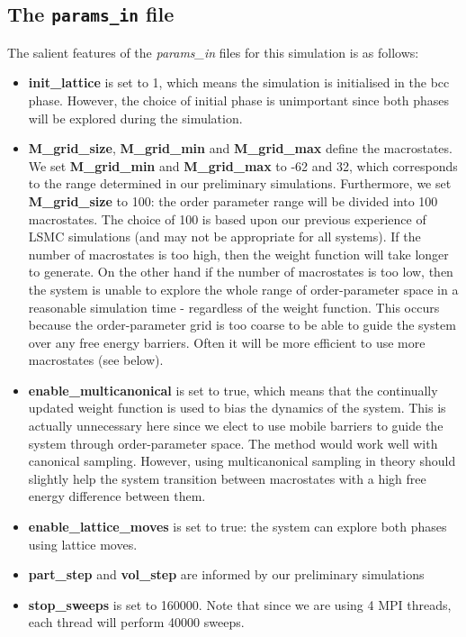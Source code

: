 \documentclass{report}
\begin{document}
\subsection{The \texttt{params\_in} file}
The salient features of the \emph{params\_in} files for this simulation is as follows:
\begin{itemize}
\item \textbf{init\_lattice} is set to 1, which means the simulation is initialised in the bcc phase. However, the choice of initial phase is 
  unimportant since both phases will be explored during the simulation.
\item \textbf{M\_grid\_size}, \textbf{M\_grid\_min} and \textbf{M\_grid\_max} define the macrostates. We set \textbf{M\_grid\_min} and \textbf{M\_grid\_max}
  to -62 and 32, which corresponds to the
  range determined in our preliminary simulations. Furthermore, we set \textbf{M\_grid\_size} to 100: the order parameter range will be divided into
  100 macrostates. The choice of 100 is based upon our previous experience of LSMC simulations (and may not be appropriate for all systems). 
  If the number of macrostates is too high, then the weight function will take longer to generate. On the other hand if the number of macrostates
  is too low, then the system is unable to explore the whole range of order-parameter space in a reasonable simulation time - regardless
  of the weight function. This occurs because the order-parameter grid is too coarse to be able to guide the system over any free energy barriers.
  Often it will be more efficient to use more macrostates (see below).
\item \textbf{enable\_multicanonical} is set to true, which means that the continually updated weight function is used to bias the dynamics of the system.
  This is actually unnecessary here since we elect to use mobile barriers to guide the system through order-parameter space. The method would
  work well with canonical sampling. However, using multicanonical sampling in theory should slightly help the system transition between 
  macrostates with a high free energy difference between them.
\item \textbf{enable\_lattice\_moves} is set to true: the system can explore both phases using lattice moves.
\item \textbf{part\_step} and \textbf{vol\_step} are informed by our preliminary simulations
\item \textbf{stop\_sweeps} is set to 160000. Note that since we are using 4 MPI threads, each thread will perform 40000 sweeps.

\end{itemize}
\end{document}

